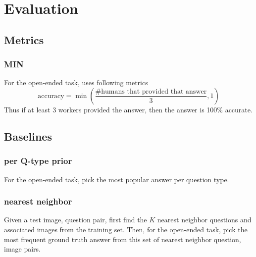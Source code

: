 \chapter{Evaluation}
\section{Metrics}

\subsection{MIN}
For the open-ended task, \cite{VQA} uses following metrics
\[ \mbox{accuracy} = \min (\frac{\mbox{\# humans that provided that answer}}{3}, 1)\]
Thus if at least 3 workers provided the answer, then the answer is  100\% accurate.




\section{Baselines}

\subsection{per Q-type prior}
For the open-ended task, pick the most popular answer per question type. \cite{VQA}

\subsection{nearest neighbor}
Given a test image, question pair, first find the $ K $ nearest neighbor questions and associated images from the training set. Then, for the open-ended task, pick the most frequent ground truth answer from this set of nearest neighbor question, image pairs.

